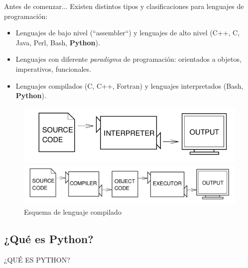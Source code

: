 \documentclass[11pt]{beamer}
\begin{document}
\begin{frame}{Antes de comenzar...}
Existen distintos tipos y clasificaciones para lenguajes de programación:
\begin{itemize}
\item Lenguajes de bajo nivel (``assembler``) y lenguajes de alto nivel (C++, C, Java, Perl, Bash, \textbf{Python}).
\pause
\item Lenguajes con diferente {\it paradigma} de programación: orientados a objetos, imperativos, funcionales.
\pause
\item Lenguajes compilados (C, C++, Fortran) y lenguajes interpretados (Bash, \textbf{Python}).
\end{itemize}
\end{frame}

\begin{frame}
\begin{figure}
\includegraphics[scale=0.3]{interpretado.png}
\caption{Esquema de lenguaje interpretado}
\includegraphics[scale=0.3]{compilado.png}
\caption{Esquema de lenguaje compilado}
\end{figure}
\end{frame}

\subsection{¿Qué es Python?}
\begin{frame}
\begin{center}
\begin{huge}
¿QUÉ ES PYTHON?
\end{huge}
\end{center}
\end{frame}
\end{document}
